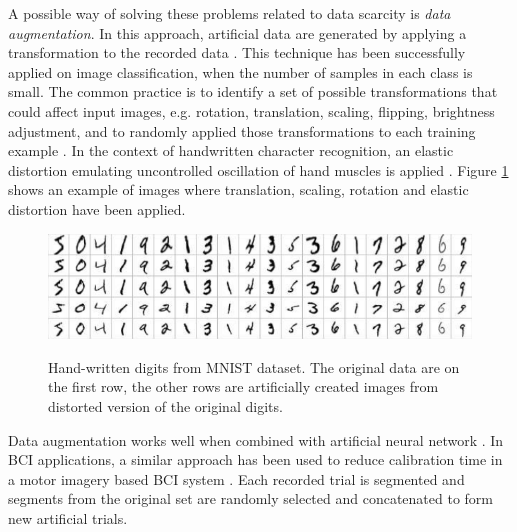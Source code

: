 A possible way of solving these problems related to data scarcity is \emph{data augmentation}. 
In this approach, artificial data are generated by applying a transformation to the recorded data \citep{van_dyk_art_2001, grandvalet_anisotropic_2000}.
This technique has been successfully applied on image classification, when the number of samples in each class is small.
The common practice is to identify a set of possible transformations that could affect input images, e.g. rotation, translation, scaling, flipping, brightness adjustment, and to randomly applied those transformations to each training example \citep{dieleman_rotation-invariant_2015}. 
In the context of handwritten character recognition, an elastic distortion emulating uncontrolled oscillation of hand muscles is applied \citep{simard_best_2003}. %
Figure \ref{fig:mnist-transformations} shows an example of images where translation, scaling, rotation and elastic distortion have been applied. 
\begin{figure}[h!]
\includegraphics[width=1\columnwidth]{Figures/mnist} 
\label{fig:mnist-transformations}
\caption{Hand-written digits from MNIST dataset. The original data are on the first row, the other rows are artificially created images from distorted version of the original digits. \citep[Image taken from ][]{ciresan_multi-column_2012}}
\end{figure} 
Data augmentation works well when combined with artificial neural network \citep{duda_pattern_2001, ciresan_multi-column_2012, krizhevsky_imagenet_2012}.
In BCI applications, a similar approach has been used to reduce calibration time in a motor imagery based BCI system \citep{lotte_generating_2011}.
Each recorded trial is segmented and segments from the original set are randomly selected and concatenated to form new artificial trials. 

